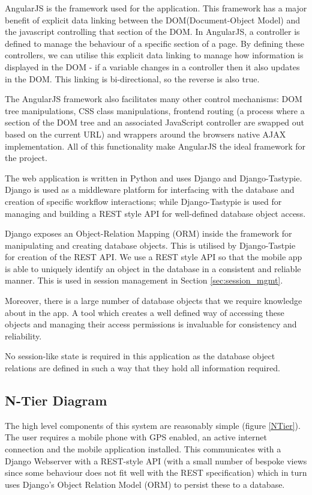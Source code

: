 AngularJS\cite{angularjs} is the framework used for the
application. This framework has a major benefit of explicit data linking
between the DOM(Document-Object Model) and the javascript controlling
that section of the DOM. In AngularJS, a controller is defined to
manage the behaviour of a specific section of a page. By defining
these controllers, we can utilise this explicit data linking to manage
how information is displayed in the DOM - if a variable changes in a
controller then it also updates in the DOM. This linking is
bi-directional, so the reverse is also true. 

The AngularJS framework also facilitates many other control
mechanisms: DOM tree manipulations, CSS class manipulations, frontend
routing (a process where a section of the DOM tree and an associated
JavaScript controller are swapped out based on the current URL) and
wrappers around the browsers native AJAX implementation. All of this
functionality make AngularJS the ideal framework for the project. 

The web application is written in Python and uses Django\cite{django}
and Django-Tastypie\cite{tastypie}. Django is used as a middleware
platform for interfacing with the database and creation of specific
workflow interactions; while Django-Tastypie is used for managing and
building a REST style API for well-defined database object access.

Django exposes an Object-Relation Mapping (ORM) inside the framework
for manipulating and creating database objects. This is utilised by
Django-Tastpie for creation of the REST API. We use a REST style API
so that the mobile app is able to uniquely identify an object in the
database in a consistent and reliable manner. This is used in 
session management in Section \ref{sec:session_mgmt}.

Moreover, there is a large number of database objects that we require
knowledge about in the app. A tool which creates a well defined way of
accessing these objects and managing their access permissions is
invaluable for consistency and reliability.

No session-like state is required in this application as the database
object relations are defined in such a way that they hold all
information required. 

\subsection{N-Tier Diagram}
The high level components of this system are reasonably simple (figure
\ref{NTier}). The
user requires a mobile phone with GPS enabled, an active internet
connection and the mobile application installed. This communicates
with a Django Webserver with a REST-style API (with a small number of
bespoke views since some behaviour does not fit well with the REST
specification) which in turn uses Django's Object Relation Model (ORM)
to persist these to a database.

